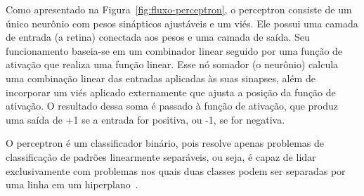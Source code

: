             Como apresentado na Figura~\ref{fig:fluxo-perceptron}, o perceptron consiste de um único neurônio com 
            pesos sinápticos ajustáveis e um viés. Ele possui uma camada de entrada (a retina) conectada aos pesos e 
            uma camada de saída. Seu funcionamento baseia-se em um combinador linear seguido por uma função de 
            ativação que realiza uma função linear. Esse nó somador (o neurônio) calcula uma combinação linear das 
            entradas aplicadas às suas sinapses, além de incorporar um viés aplicado externamente que ajusta a posição
            da função de ativação. O resultado dessa soma é passado à função de ativação, que produz uma saída de +1 
            se a entrada for positiva, ou -1, se for negativa. 
            
            O perceptron é um classificador binário, pois resolve apenas problemas de classificação de padrões 
            linearmente separáveis, ou seja, é capaz de lidar exclusivamente com problemas nos quais duas classes 
            podem ser separadas por uma linha em um hiperplano~\cite{haykin2009neural}. 



            


